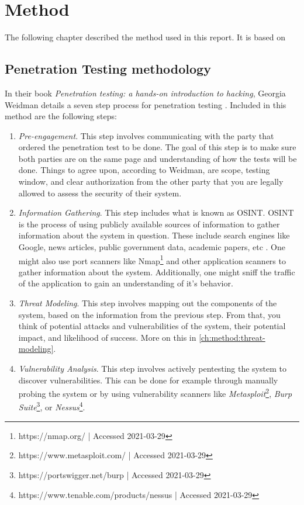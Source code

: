 \chapter{Method} \label{ch:method}
The following chapter described the method used in this report. It is based on 

\section{Penetration Testing methodology}
In their book \textit{Penetration testing: a hands-on introduction to hacking}, Georgia Weidman details a seven step process for penetration testing \cite{weidman2014}. Included in this method are the following steps:
\begin{enumerate}
    \item \textit{Pre-engagement}. This step involves communicating with the party that ordered the penetration test to be done. The goal of this step is to make sure both parties are on the same page and understanding of how the tests will be done. Things to agree upon, according to Weidman, are scope, testing window, and clear authorization from the other party that you are legally allowed to assess the security of their system.
    \item \textit{Information Gathering}. This step includes what is known as \gls{OSINT}. \gls{OSINT} is the process of using publicly available sources of information to gather information about the system in question. These include search engines like Google, news articles, public government data, academic papers, etc \cite{steele2007open}. One might also use port scanners like Nmap\footnote{https://nmap.org/ | Accessed 2021-03-29} and other application scanners to gather information about the system. Additionally, one might sniff the traffic of the application to gain an understanding of it's behavior.
    \item \textit{Threat Modeling}. This step involves mapping out the components of the system, based on the information from the previous step. From that, you think of potential attacks and vulnerabilities of the system, their potential impact, and likelihood of success. More on this in \ref{ch:method:threat-modeling}.
    \item \textit{Vulnerability Analysis}. This step involves actively pentesting the system to discover vulnerabilities. This can be done for example through manually probing the system or by using vulnerability scanners like \textit{Metasploit}\footnote{https://www.metasploit.com/ | Accessed 2021-03-29}, \textit{Burp Suite}\footnote{https://portswigger.net/burp | Accessed 2021-03-29}, or \textit{Nessus}\footnote{https://www.tenable.com/products/nessus | Accessed 2021-03-29}.

\end{enumerate}
